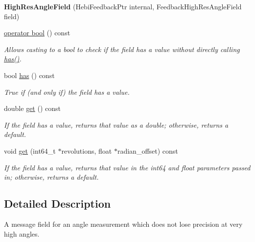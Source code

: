 \begin{DoxyCompactItemize}
\item 
\mbox{\label{classhebi_1_1Feedback_1_1HighResAngleField_a58cd10f4e873eff00070789de04bcaf2}} 
{\bfseries High\+Res\+Angle\+Field} (Hebi\+Feedback\+Ptr internal, Feedback\+High\+Res\+Angle\+Field field)
\item 
\hyperlink{classhebi_1_1Feedback_1_1HighResAngleField_aec95d30e5ac2d4e874b44056091d25eb}{operator bool} () const
\begin{DoxyCompactList}\small\item\em Allows casting to a bool to check if the field has a value without directly calling {\ttfamily \hyperlink{classhebi_1_1Feedback_1_1HighResAngleField_a5d3c8b5a153e1e0fcec716f4d6371d9c}{has()}}. \end{DoxyCompactList}\item 
\mbox{\label{classhebi_1_1Feedback_1_1HighResAngleField_a5d3c8b5a153e1e0fcec716f4d6371d9c}} 
bool \hyperlink{classhebi_1_1Feedback_1_1HighResAngleField_a5d3c8b5a153e1e0fcec716f4d6371d9c}{has} () const
\begin{DoxyCompactList}\small\item\em True if (and only if) the field has a value. \end{DoxyCompactList}\item 
double \hyperlink{classhebi_1_1Feedback_1_1HighResAngleField_a3a82e8133790fe8ae94ae3ac6dd357f5}{get} () const
\begin{DoxyCompactList}\small\item\em If the field has a value, returns that value as a double; otherwise, returns a default. \end{DoxyCompactList}\item 
void \hyperlink{classhebi_1_1Feedback_1_1HighResAngleField_a1303fa3a68aeb90f36711389d507c027}{get} (int64\+\_\+t $\ast$revolutions, float $\ast$radian\+\_\+offset) const
\begin{DoxyCompactList}\small\item\em If the field has a value, returns that value in the int64 and float parameters passed in; otherwise, returns a default. \end{DoxyCompactList}\end{DoxyCompactItemize}


\subsection{Detailed Description}
A message field for an angle measurement which does not lose precision at very high angles. 


